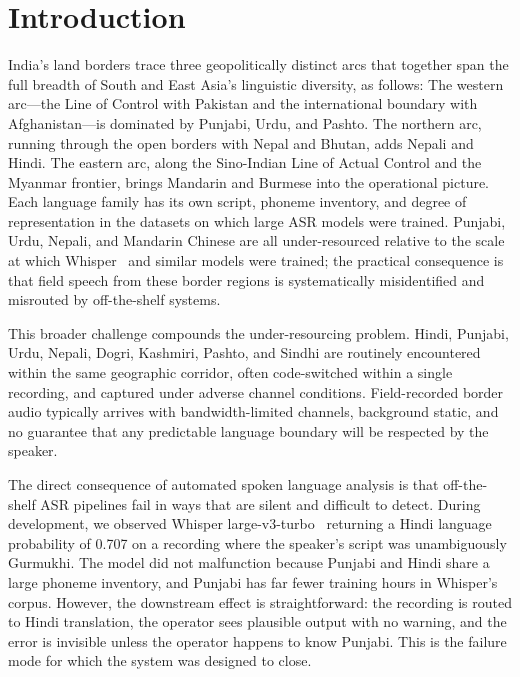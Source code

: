 \documentclass[12pt, onecolumn]{IEEEtran}
\begin{document}
\section{Introduction}
\label{sec:intro}

India's land borders trace three geopolitically distinct arcs that together span the full breadth of South and East Asia's linguistic diversity, as follows: The western arc---the Line of Control with Pakistan and the international boundary with Afghanistan---is dominated by Punjabi, Urdu, and Pashto. The northern arc, running through the open borders with Nepal and Bhutan, adds Nepali and Hindi. The eastern arc, along the Sino-Indian Line of Actual Control and the Myanmar frontier, brings Mandarin and Burmese into the operational picture. Each language family has its own script, phoneme inventory, and degree of representation in the datasets on which large ASR models were trained. Punjabi, Urdu, Nepali, and Mandarin Chinese are all under-resourced relative to the scale at which Whisper~\cite{radford2022whisper} and similar models were trained; the practical consequence is that field speech from these border regions is systematically misidentified and misrouted by off-the-shelf systems.

This broader challenge compounds the under-resourcing problem. Hindi, Punjabi, Urdu, Nepali, Dogri, Kashmiri, Pashto, and Sindhi are routinely encountered within the same geographic corridor, often code-switched within a single recording, and captured under adverse channel conditions. Field-recorded border audio typically arrives with bandwidth-limited channels, background static, and no guarantee that any predictable language boundary will be respected by the speaker.

The direct consequence of automated spoken language analysis is that off-the-shelf ASR pipelines fail in ways that are silent and difficult to detect. During development, we observed Whisper large-v3-turbo~\cite{radford2022whisper} returning a Hindi language probability of 0.707 on a recording where the speaker's script was unambiguously Gurmukhi. The model did not malfunction because Punjabi and Hindi share a large phoneme inventory, and Punjabi has far fewer training hours in Whisper's corpus. However, the downstream effect is straightforward: the recording is routed to Hindi translation, the operator sees plausible output with no warning, and the error is invisible unless the operator happens to know Punjabi. This is the failure mode for which the system was designed to close.
\end{document}
